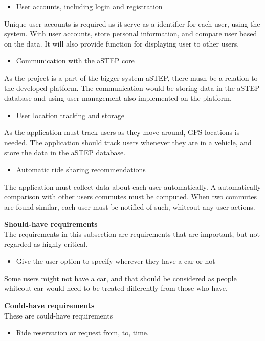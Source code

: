 \begin{itemize}
	\item User accounts, including login and registration
\end{itemize}
Unique user accounts is required as it serve as a identifier for each user, using the system. With user accounts, store personal information, and compare user based on the data. It will also provide function for displaying user to other users.

\begin{itemize}
	\item Communication with the aSTEP core
\end{itemize}
As the project is a part of the bigger system aSTEP, there mush be a relation to the developed platform. The communication would be storing data in the aSTEP database and using user management also implemented on the platform.

\begin{itemize}
	\item User location tracking and storage
\end{itemize}
As the application must track users as they move around, GPS locations is needed. The application should track users whenever they are in a vehicle, and store the data in the aSTEP database. 

\begin{itemize}
	\item Automatic ride sharing recommendations
\end{itemize}
The application must collect data about each user automatically. A automatically comparison with other users commutes must be computed. When two commutes are found similar, each user must be notified of such, whiteout any user actions.


\textbf{Should-have requirements}\\
The requirements in this subsection are requirements that are important, but not regarded as highly critical.
\begin{itemize}
	\item Give the user option to specify wherever they have a car or not
\end{itemize}
Some users might not have a car, and that should be considered as people whiteout car would need to be treated differently from those who have.

\textbf{Could-have requirements}\\
These are could-have requirements
\begin{itemize}
	\item Ride reservation or request from, to, time.
\end{itemize}

